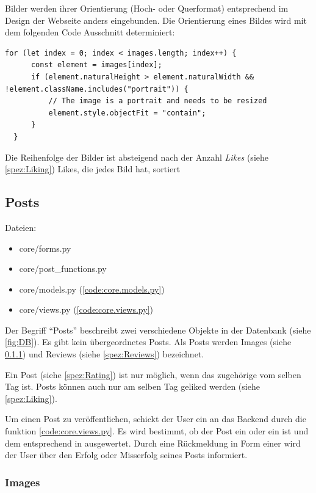 Bilder werden ihrer Orientierung (Hoch- oder Querformat) entsprechend im Design
der Webseite anders eingebunden. Die Orientierung eines Bildes wird mit dem folgenden Code Ausschnitt determiniert:

\begin{lstlisting}
for (let index = 0; index < images.length; index++) {
      const element = images[index];
      if (element.naturalHeight > element.naturalWidth && !element.className.includes("portrait")) {
          // The image is a portrait and needs to be resized
          element.style.objectFit = "contain";
      }
  }
\end{lstlisting}

Die Reihenfolge der Bilder ist absteigend nach der Anzahl \emph{Likes} (siehe
\ref{spez:Liking}) Likes, die jedes Bild hat, sortiert


\subsection{Posts} \label{spez:Posts}

Dateien:
\begin{itemize}
    \item core/forms.py 
    \item core/post\_functions.py
    \item core/models.py (\ref{code:core.models.py})
    \item core/views.py (\ref{code:core.views.py})
\end{itemize}

Der Begriff ``Posts'' beschreibt zwei verschiedene Objekte in der Datenbank (siehe
\ref{fig:DB}). Es gibt kein übergeordnetes Posts. Als Posts werden Images
(siehe \ref{spez:Images}) und Reviews (siehe \ref{spez:Reviews}) bezeichnet.

Ein Post (siehe \ref{spez:Rating}) ist nur möglich, wenn das zugehörige
 vom selben Tag ist. Posts können auch nur am selben Tag geliked
werden (siehe \ref{spez:Liking}).

Um einen Post zu veröffentlichen, schickt der User ein  an
das Backend durch die  funktion 
\ref{code:core.views.py}. Es wird bestimmt, ob der Post ein  oder
ein  ist und dem entsprechend in 
ausgewertet. Durch eine Rückmeldung in Form einer  wird der
User über den Erfolg oder Misserfolg seines Posts informiert.

\subsubsection{Images} \label{spez:Images}

